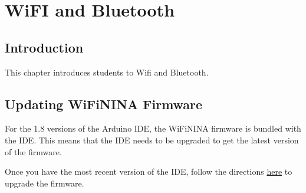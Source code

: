 \chapter{WiFI and Bluetooth}

\section{Introduction}
This chapter introduces students to Wifi and Bluetooth.

\section{Updating WiFiNINA Firmware}
For the 1.8 versions of the Arduino IDE, the WiFiNINA firmware is bundled with the IDE. This means that the
IDE needs to be upgraded to get the latest version of the firmware.

Once you have the most recent version of the IDE, follow the directions
\href{https://support.arduino.cc/hc/en-us/articles/360013896579-Check-and-update-the-firmware-for-WiFiNINA-and-WiFi101}{here}
to upgrade the firmware.